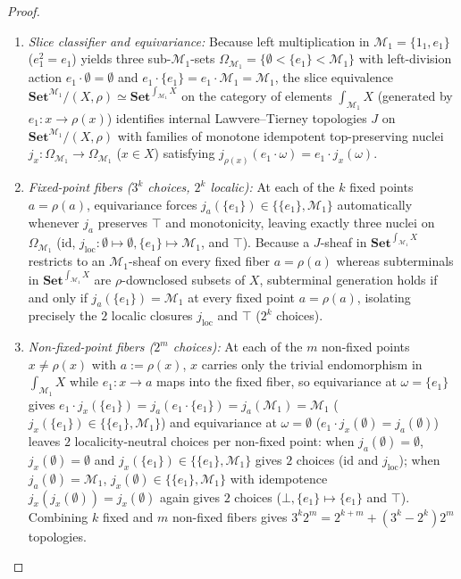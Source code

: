 \begin{proof}
\begin{enumerate}
  \item \emph{Slice classifier and equivariance:} Because left multiplication in $\mathcal{M}_1 = \{1_1, e_1\}$ ($e_1^2 = e_1$) yields three sub-$\mathcal{M}_1$-sets $\Omega_{\mathcal{M}_1} = \{\emptyset < \{e_1\} < \mathcal{M}_1\}$ with left-division action $e_1 \cdot \emptyset = \emptyset$ and $e_1 \cdot \{e_1\} = e_1 \cdot \mathcal{M}_1 = \mathcal{M}_1$, the slice equivalence $\mathbf{Set}^{\mathcal{M}_1}/(X, \rho) \simeq \mathbf{Set}^{\int_{\mathcal{M}_1} X}$ on the category of elements $\int_{\mathcal{M}_1} X$ (generated by $e_1 : x \to \rho(x)$) identifies internal Lawvere--Tierney topologies $J$ on $\mathbf{Set}^{\mathcal{M}_1}/(X, \rho)$ with families of monotone idempotent top-preserving nuclei $j_x : \Omega_{\mathcal{M}_1} \to \Omega_{\mathcal{M}_1}$ ($x \in X$) satisfying $j_{\rho(x)}(e_1 \cdot \omega) = e_1 \cdot j_x(\omega)$.
  \item \emph{Fixed-point fibers ($3^k$ choices, $2^k$ localic):} At each of the $k$ fixed points $a = \rho(a)$, equivariance forces $j_a(\{e_1\}) \in \{\{e_1\}, \mathcal{M}_1\}$ automatically whenever $j_a$ preserves $\top$ and monotonicity, leaving exactly three nuclei on $\Omega_{\mathcal{M}_1}$ ($\mathrm{id}$, $j_{\mathrm{loc}} : \emptyset \mapsto \emptyset, \{e_1\} \mapsto \mathcal{M}_1$, and $\top$). Because a $J$-sheaf in $\mathbf{Set}^{\int_{\mathcal{M}_1} X}$ restricts to an $\mathcal{M}_1$-sheaf on every fixed fiber $a = \rho(a)$ whereas subterminals in $\mathbf{Set}^{\int_{\mathcal{M}_1} X}$ are $\rho$-downclosed subsets of $X$, subterminal generation holds if and only if $j_a(\{e_1\}) = \mathcal{M}_1$ at every fixed point $a = \rho(a)$, isolating precisely the $2$ localic closures $j_{\mathrm{loc}}$ and $\top$ ($2^k$ choices).
  \item \emph{Non-fixed-point fibers ($2^m$ choices):} At each of the $m$ non-fixed points $x \neq \rho(x)$ with $a := \rho(x)$, $x$ carries only the trivial endomorphism in $\int_{\mathcal{M}_1} X$ while $e_1 : x \to a$ maps into the fixed fiber, so equivariance at $\omega = \{e_1\}$ gives $e_1 \cdot j_x(\{e_1\}) = j_a(e_1 \cdot \{e_1\}) = j_a(\mathcal{M}_1) = \mathcal{M}_1$ ($j_x(\{e_1\}) \in \{\{e_1\}, \mathcal{M}_1\}$) and equivariance at $\omega = \emptyset$ ($e_1 \cdot j_x(\emptyset) = j_a(\emptyset)$) leaves $2$ localicity-neutral choices per non-fixed point: when $j_a(\emptyset) = \emptyset$, $j_x(\emptyset) = \emptyset$ and $j_x(\{e_1\}) \in \{\{e_1\}, \mathcal{M}_1\}$ gives $2$ choices ($\mathrm{id}$ and $j_{\mathrm{loc}}$); when $j_a(\emptyset) = \mathcal{M}_1$, $j_x(\emptyset) \in \{\{e_1\}, \mathcal{M}_1\}$ with idempotence $j_x(j_x(\emptyset)) = j_x(\emptyset)$ again gives $2$ choices ($\bot, \{e_1\} \mapsto \{e_1\}$ and $\top$). Combining $k$ fixed and $m$ non-fixed fibers gives $3^k 2^m = 2^{k+m} + (3^k - 2^k) 2^m$ topologies.
\end{enumerate}\qedhere
\end{proof}


